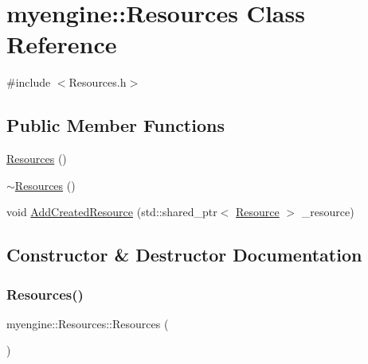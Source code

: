 \hypertarget{classmyengine_1_1_resources}{}\section{myengine\+:\+:Resources Class Reference}
\label{classmyengine_1_1_resources}


{\ttfamily \#include $<$Resources.\+h$>$}

\subsection*{Public Member Functions}
\begin{DoxyCompactItemize}
\item 
\hyperlink{classmyengine_1_1_resources_a510c0c94b6b153ab2513f13bc114a7b1}{Resources} ()
\item 
\hyperlink{classmyengine_1_1_resources_a70ec392cd9f38bb1752f868c00a755c6}{$\sim$\+Resources} ()
\item 
void \hyperlink{classmyengine_1_1_resources_aec0d326b9f0e38e6f1aab9c6ecbaf733}{Add\+Created\+Resource} (std\+::shared\+\_\+ptr$<$ \hyperlink{classmyengine_1_1_resource}{Resource} $>$ \+\_\+resource)
\end{DoxyCompactItemize}


\subsection{Constructor \& Destructor Documentation}
\mbox{\label{classmyengine_1_1_resources_a510c0c94b6b153ab2513f13bc114a7b1}} 
\subsubsection{\texorpdfstring{Resources()}{Resources()}}
{\footnotesize\ttfamily myengine\+::\+Resources\+::\+Resources (\begin{DoxyParamCaption}{ }\end{DoxyParamCaption})}

\mbox{\label{classmyengine_1_1_resources_a70ec392cd9f38bb1752f868c00a755c6}} 
